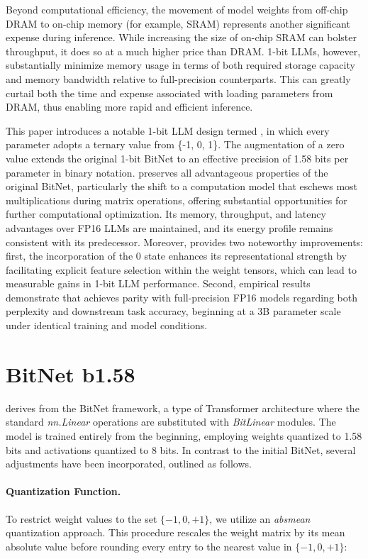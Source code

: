 Beyond computational efficiency, the movement of model weights from off-chip DRAM to on-chip memory (for example, SRAM) represents another significant expense during inference. While increasing the size of on-chip SRAM can bolster throughput, it does so at a much higher price than DRAM. 1-bit LLMs, however, substantially minimize memory usage in terms of both required storage capacity and memory bandwidth relative to full-precision counterparts. This can greatly curtail both the time and expense associated with loading parameters from DRAM, thus enabling more rapid and efficient inference.

This paper introduces a notable 1-bit LLM design termed \textbf{}, in which every parameter adopts a ternary value from \{-1, 0, 1\}. The augmentation of a zero value extends the original 1-bit BitNet to an effective precision of 1.58 bits per parameter in binary notation.  preserves all advantageous properties of the original BitNet, particularly the shift to a computation model that eschews most multiplications during matrix operations, offering substantial opportunities for further computational optimization. Its memory, throughput, and latency advantages over FP16 LLMs are maintained, and its energy profile remains consistent with its predecessor. Moreover,  provides two noteworthy improvements: first, the incorporation of the 0 state enhances its representational strength by facilitating explicit feature selection within the weight tensors, which can lead to measurable gains in 1-bit LLM performance. Second, empirical results demonstrate that  achieves parity with full-precision FP16 models regarding both perplexity and downstream task accuracy, beginning at a 3B parameter scale under identical training and model conditions.

\section{BitNet b1.58}

 derives from the BitNet framework, a type of Transformer architecture where the standard \emph{nn.Linear} operations are substituted with \emph{BitLinear} modules. The model is trained entirely from the beginning, employing weights quantized to 1.58 bits and activations quantized to 8 bits. In contrast to the initial BitNet, several adjustments have been incorporated, outlined as follows.

\paragraph{Quantization Function.} To restrict weight values to the set $\{-1, 0, +1\}$, we utilize an \emph{absmean} quantization approach. This procedure rescales the weight matrix by its mean absolute value before rounding every entry to the nearest value in $\{-1, 0, +1\}$:

